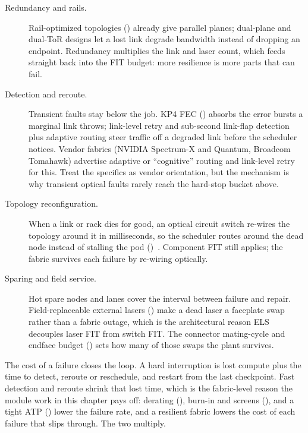\begin{description}
\item[Redundancy and rails.] Rail-optimized topologies ()
      already give parallel planes; dual-plane and dual-ToR designs let a lost link
      degrade bandwidth instead of dropping an endpoint. Redundancy multiplies the
      link and laser count, which feeds straight back into the FIT budget: more
      resilience is more parts that can fail.
\item[Detection and reroute.] Transient faults stay below the job. KP4 FEC
      () absorbs the error bursts a marginal link throws; link-level
      retry and sub-second link-flap detection plus adaptive routing steer traffic
      off a degraded link before the scheduler notices. Vendor fabrics (NVIDIA
      Spectrum-X and Quantum, Broadcom Tomahawk) advertise adaptive or ``cognitive''
      routing and link-level retry for this. Treat the specifics as vendor
      orientation, but the mechanism is why transient optical faults rarely reach
      the hard-stop bucket above.
\item[Topology reconfiguration.] When a link or rack dies for good, an optical
      circuit switch re-wires the topology around it in milliseconds, so the
      scheduler routes around the dead node instead of stalling the pod
      ()~\citep{tpuv4ocs}. Component FIT still applies; the fabric
      survives each failure by re-wiring optically.
\item[Sparing and field service.] Hot spare nodes and lanes cover the interval
      between failure and repair. Field-replaceable external lasers ()
      make a dead laser a faceplate swap rather than a fabric outage, which is the
      architectural reason ELS decouples laser FIT from switch FIT. The connector
      mating-cycle and endface budget () sets how
      many of those swaps the plant survives.
\end{description}

The cost of a failure closes the loop. A hard interruption is lost compute plus
the time to detect, reroute or reschedule, and restart from the last checkpoint.
Fast detection and reroute shrink that lost time, which is the fabric-level reason
the module work in this chapter pays off: derating (),
burn-in and screens (), and a tight ATP ()
lower the failure rate, and a resilient fabric lowers the cost of each failure that
slips through. The two multiply.

